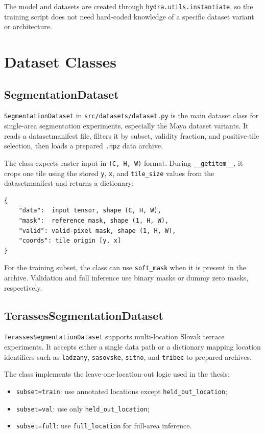 \begin{sloppypar}
The model and datasets are created through \texttt{hydra.utils.instantiate}, so the training script does not need hard-coded knowledge of a specific dataset variant or architecture.

\section{Dataset Classes}

\subsection{SegmentationDataset}

\texttt{SegmentationDataset} in \texttt{src/datasets/dataset.py} is the main dataset class for single-area segmentation experiments, especially the Maya dataset variants. It reads a \gls{datasetmanifest} file, filters it by subset, validity fraction, and positive-tile selection, then loads a prepared \texttt{.npz} data archive.

The class expects raster input in \texttt{(C, H, W)} format. During \texttt{\_\_getitem\_\_}, it crops one tile using the stored \texttt{y}, \texttt{x}, and \texttt{tile\_size} values from the \gls{datasetmanifest} and returns a dictionary:

\begin{verbatim}
{
    "data":  input tensor, shape (C, H, W),
    "mask":  reference mask, shape (1, H, W),
    "valid": valid-pixel mask, shape (1, H, W),
    "coords": tile origin [y, x]
}
\end{verbatim}

For the training subset, the class can use \texttt{soft\_mask} when it is present in the archive. Validation and full inference use binary masks or dummy zero masks, respectively.

\subsection{TerassesSegmentationDataset}

\texttt{TerassesSegmentationDataset} supports multi-location Slovak terrace experiments. It accepts either a single data path or a dictionary mapping location identifiers such as \texttt{ladzany}, \texttt{sasovske}, \texttt{sitno}, and \texttt{tribec} to prepared archives.

The class implements the leave-one-location-out logic used in the thesis:

\begin{itemize}
    \item \texttt{subset=train}: use annotated locations except \texttt{held\_out\_location};
    \item \texttt{subset=val}: use only \texttt{held\_out\_location};
    \item \texttt{subset=full}: use \texttt{full\_location} for full-area inference.
\end{itemize}


\end{sloppypar}
